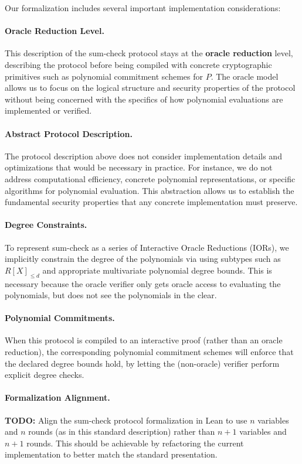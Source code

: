 Our formalization includes several important implementation considerations:

\paragraph{Oracle Reduction Level.} This description of the sum-check protocol stays at the \textbf{oracle reduction} level, describing the protocol before being compiled with concrete cryptographic primitives such as polynomial commitment schemes for $P$. The oracle model allows us to focus on the logical structure and security properties of the protocol without being concerned with the specifics of how polynomial evaluations are implemented or verified.

\paragraph{Abstract Protocol Description.} The protocol description above does not consider implementation details and optimizations that would be necessary in practice. For instance, we do not address computational efficiency, concrete polynomial representations, or specific algorithms for polynomial evaluation. This abstraction allows us to establish the fundamental security properties that any concrete implementation must preserve.

\paragraph{Degree Constraints.} To represent sum-check as a series of Interactive Oracle Reductions (IORs), we implicitly constrain the degree of the polynomials via using subtypes such as $R[X]_{\leq d}$ and appropriate multivariate polynomial degree bounds. This is necessary because the oracle verifier only gets oracle access to evaluating the polynomials, but does not see the polynomials in the clear.

\paragraph{Polynomial Commitments.} When this protocol is compiled to an interactive proof (rather than an oracle reduction), the corresponding polynomial commitment schemes will enforce that the declared degree bounds hold, by letting the (non-oracle) verifier perform explicit degree checks.

\paragraph{Formalization Alignment.} \textbf{TODO:} Align the sum-check protocol formalization in Lean to use $n$ variables and $n$ rounds (as in this standard description) rather than $n+1$ variables and $n+1$ rounds. This should be achievable by refactoring the current implementation to better match the standard presentation.

